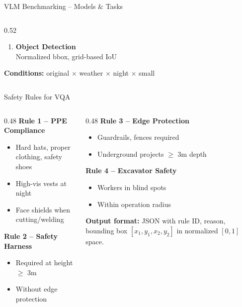 \documentclass[aspectratio=169, 10pt]{beamer}
\begin{document}
\begin{frame}{VLM Benchmarking -- Models \& Tasks}
\begin{columns}[T]
\begin{column}{0.52\textwidth}
\begin{enumerate}
    \vspace{0.2em}
    \item \textbf{Object Detection}\\
    {\scriptsize Normalized bbox, grid-based IoU}
\end{enumerate}

\vspace{0.4em}
{\footnotesize \textbf{Conditions:} original $\times$ weather $\times$ night $\times$ small}
\end{column}
\end{columns}
\end{frame}

\begin{frame}{Safety Rules for VQA}
\begin{columns}[T]
\begin{column}{0.48\textwidth}
\textbf{\textcolor{warnred}{Rule 1} -- PPE Compliance}
\begin{itemize}
    \item Hard hats, proper clothing, safety shoes
    \item High-vis vests at night
    \item Face shields when cutting/welding
\end{itemize}

\vspace{0.4em}
\textbf{\textcolor{warnred}{Rule 2} -- Safety Harness}
\begin{itemize}
    \item Required at height $\geq$ 3m
    \item Without edge protection
\end{itemize}
\end{column}
\begin{column}{0.48\textwidth}
\textbf{\textcolor{warnred}{Rule 3} -- Edge Protection}
\begin{itemize}
    \item Guardrails, fences required
    \item Underground projects $\geq$ 3m depth
\end{itemize}

\vspace{0.4em}
\textbf{\textcolor{warnred}{Rule 4} -- Excavator Safety}
\begin{itemize}
    \item Workers in blind spots
    \item Within operation radius
\end{itemize}

\vspace{0.6em}
{\footnotesize \textbf{Output format:} JSON with rule ID, reason, bounding box $[x_1, y_1, x_2, y_2]$ in normalized $[0,1]$ space.}
\end{column}
\end{columns}
\end{frame}
\end{document}
